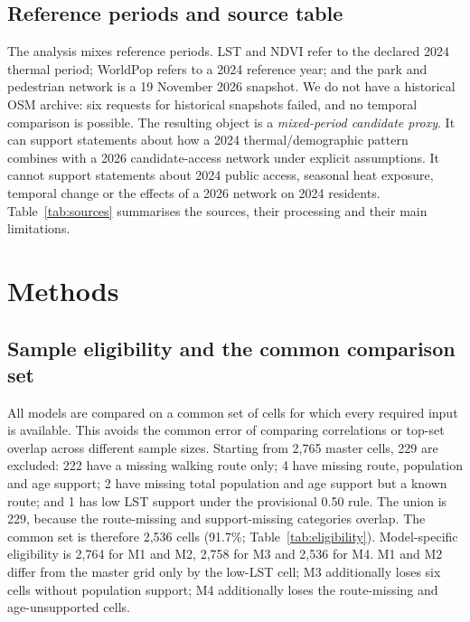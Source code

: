 \documentclass[times,twoside]{_Templates/MultiTargetManuscript}
\begin{document}


\subsection{Reference periods and source table}

The analysis mixes reference periods. LST and NDVI refer to the declared 2024
thermal period; WorldPop refers to a 2024 reference year; and the park and
pedestrian network is a 19 November 2026 snapshot. We do not have a historical
OSM archive: six requests for historical snapshots failed, and no temporal
comparison is possible. The resulting object is a \emph{mixed-period candidate
proxy}. It can support statements about how a 2024 thermal/demographic pattern
combines with a 2026 candidate-access network under explicit assumptions. It
cannot support statements about 2024 public access, seasonal heat exposure,
temporal change or the effects of a 2026 network on 2024 residents.
Table~\ref{tab:sources} summarises the sources, their processing and their main
limitations.



\section{Methods}

\subsection{Sample eligibility and the common comparison set}

All models are compared on a common set of cells for which every required input
is available. This avoids the common error of comparing correlations or top-set
overlap across different sample sizes. Starting from 2,765 master cells, 229 are
excluded: 222 have a missing walking route only; 4 have missing route,
population and age support; 2 have missing total population and age support but a
known route; and 1 has low LST support under the provisional 0.50 rule. The
union is 229, because the route-missing and support-missing categories overlap.
The common set is therefore 2,536 cells (91.7\%; Table~\ref{tab:eligibility}).
Model-specific eligibility is 2,764 for M1 and M2, 2,758 for M3 and 2,536 for M4. M1 and M2 differ from the
master grid only by the low-LST cell; M3 additionally loses six cells without
population support; M4 additionally loses the route-missing and age-unsupported
cells.
\end{document}
